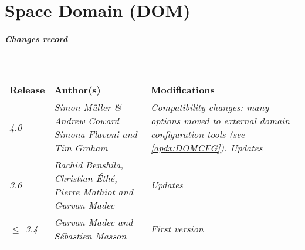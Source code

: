 \documentclass[../main/NEMO_manual]{subfiles}
\begin{document}
\chapter{Space Domain (DOM)}
\label{chap:DOM}


\thispagestyle{plain}

\chaptertoc

\paragraph{Changes record} ~\\

{\footnotesize
  \begin{tabularx}{0.8\textwidth}{l||X|X}
    Release                                                                                 &
    Author(s)                                                                               &
    Modifications                                                                           \\
    \hline
    {\em 4.0                                                                              } &
    {\em Simon M\"{u}ller \& Andrew Coward \newline \newline
      Simona Flavoni and Tim Graham                                                       } &
    {\em Compatibility changes: many options moved to external domain configuration tools
      (see \autoref{apdx:DOMCFG}). \newline
      Updates                                                                             } \\
    {\em 3.6                                                                              } &
    {\em Rachid Benshila, Christian \'{E}th\'{e}, Pierre Mathiot and Gurvan Madec         } &
    {\em Updates                                                                          } \\
    {\em $\leq$ 3.4                                                                       } &
    {\em Gurvan Madec and S\'{e}bastien Masson                                            } &
    {\em First version                                                                    }
  \end{tabularx}
}
\end{document}
